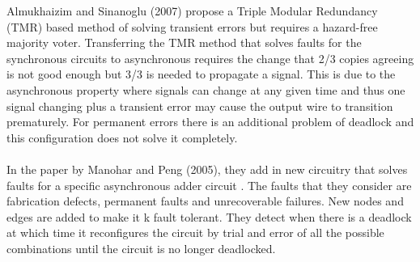 \documentclass[12pt]{report}
\begin{document}
Almukhaizim and Sinanoglu (2007) propose a Triple Modular Redundancy (TMR) based method of solving transient errors but requires a hazard-free majority voter.  Transferring the TMR method that solves faults for the synchronous circuits to asynchronous requires the change that 2/3 copies agreeing is not good enough but 3/3 is needed to propagate a signal.  This is due to the asynchronous property where signals can change at any given time and thus one signal changing plus a transient error may cause the output wire to transition prematurely.  For permanent errors there is an additional problem of deadlock and this configuration does not solve it completely. \\
\\
In the paper by Manohar and Peng (2005), they add in new circuitry that solves faults for a specific asynchronous adder circuit \cite{PengManohar_asyncadder}.  The faults that they consider are fabrication defects, permanent faults and unrecoverable failures.  New nodes and edges are added to make it k fault tolerant.  They detect when there is a deadlock at which time it reconfigures the circuit by trial and error of all the possible combinations until the circuit is no longer deadlocked.   \\
\end{document}
